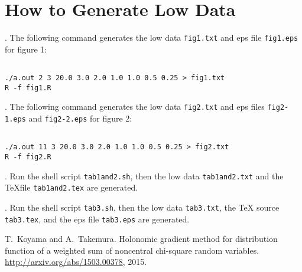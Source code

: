 \documentclass{article}
\begin{document}
\section{How to Generate Low Data}
\/.
The following command generates the low data {\tt fig1.txt}
and eps file {\tt fig1.eps} for figure 1:
\begin{lstlisting}[style=BashInputStyle]

./a.out 2 3 20.0 3.0 2.0 1.0 1.0 0.5 0.25 > fig1.txt
R -f fig1.R
\end{lstlisting}

\medskip{}\/.
The following command generates the low data {\tt fig2.txt}
and eps files {\tt fig2-1.eps} and {\tt fig2-2.eps} for figure 2:
\begin{lstlisting}[style=BashInputStyle]

./a.out 11 3 20.0 3.0 2.0 1.0 1.0 0.5 0.25 > fig2.txt
R -f fig2.R
\end{lstlisting}

\medskip{}\/.
Run the shell script {\tt tab1and2.sh}, then the low data {\tt tab1and2.txt} and 
the \TeX file {\tt tab1and2.tex} are generated.

\medskip{}\/.
Run the shell script {\tt tab3.sh}, then the low data {\tt tab3.txt}, 
the TeX source {\tt tab3.tex}, and the eps file {\tt tab3.eps} are generated.


\iftrue

\begin{thebibliography}{1}

T.~Koyama and A.~Takemura.
\newblock Holonomic gradient method for distribution function of a weighted sum
  of noncentral chi-square random variables.
\newblock \url{http://arxiv.org/abs/1503.00378}, 2015.

\end{thebibliography}

\else




\fi

\end{document}
